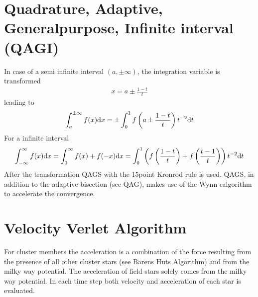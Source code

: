 \documentclass[letterpaper,10pt,english]{sphinxmanual}
\begin{document}
\section{Quadrature, Adaptive, General\sphinxhyphen{}purpose, Infinite interval (QAGI)}
\label{\detokenize{NBodySimulation/Integration:quadrature-adaptive-general-purpose-infinite-interval-qagi}}
\sphinxAtStartPar
In case of a semi infinite interval \((a,\pm \infty)\), the integration variable is transformed
\begin{equation*}
\begin{split}x = a\pm\frac{1-t}{t}\end{split}
\end{equation*}
\sphinxAtStartPar
leading to
\begin{equation*}
\begin{split}\int_a^{\pm \infty}f(x)\textup{d}x = \pm \int_0^1 f \left(a\pm\frac{1-t}{t}\right)t^{-2}\textup{d}t\end{split}
\end{equation*}
\sphinxAtStartPar
For a infinite interval
\begin{equation*}
\begin{split}\int_{-\infty}^{\infty}f(x)\textup{d}x =
\int_0^\infty f(x)+f(-x)\textup{d}x =
\int_0^1  \left ( f \left(\frac{1-t}{t}\right) + f \left(\frac{t-1}{t}\right) \right )  t^{-2}\textup{d}t\end{split}
\end{equation*}
\sphinxAtStartPar
After the transformation QAGS with the 15\sphinxhyphen{}point Kronrod rule is used.
QAGS, in addition to the adaptive bisection (see QAG), makes use of the Wynn \(\epsilon\)\sphinxhyphen{}algorithm to accelerate the convergence.


\section{Velocity Verlet Algorithm}
\label{\detokenize{NBodySimulation/Integration:velocity-verlet-algorithm}}
\sphinxAtStartPar
For cluster members the acceleration is a combination of the force resulting from the presence of all other cluster stars (see Barens Huts Algorithm)
and from the milky way potential. The acceleration of field stars solely comes from the milky way potential.
In each time step both velocity and acceleration of each star is evaluated.
\end{document}
